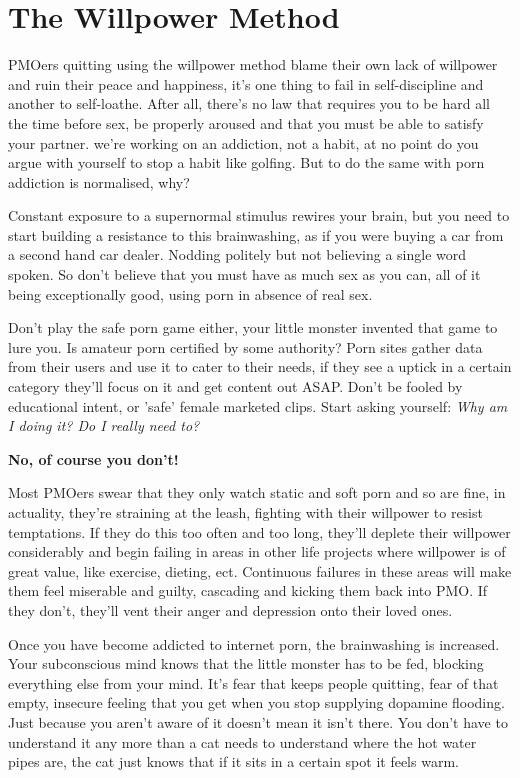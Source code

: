 \documentclass[easypeasy.tex]{subfiles}
\begin{document}
\section{The Willpower Method}
PMOers quitting using the willpower method blame their own lack of willpower and ruin their peace and happiness, it's one thing to fail in self-discipline and another to self-loathe. After all, there's no law that requires you to be hard all the time before sex, be properly aroused and that you must be able to satisfy your partner. we're working on an addiction, not a habit, at no point do you argue with yourself to stop a habit like golfing. But to do the same with porn addiction is normalised, why?

Constant exposure to a supernormal stimulus rewires your brain, but you need to start building a resistance to this brainwashing, as if you were buying a car from a second hand car dealer. Nodding politely but not believing a single word spoken. So don't believe that you must have as much sex as you can, all of it being exceptionally good, using porn in absence of real sex.

Don't play the safe porn game either, your little monster invented that game to lure you. Is amateur porn certified by some authority? Porn sites gather data from their users and use it to cater to their needs, if they see a uptick in a certain category they'll focus on it and get content out ASAP. Don't be fooled by educational intent, or 'safe' female marketed clips. Start asking yourself: \textit{Why am I doing it? Do I really need to?}

\textbf{No, of course you don't!}

Most PMOers swear that they only watch static and soft porn and so are fine, in actuality, they're straining at the leash, fighting with their willpower to resist temptations. If they do this too often and too long, they'll deplete their willpower considerably and begin failing in areas in other life projects where willpower is of great value, like exercise, dieting, ect. Continuous failures in these areas will make them feel miserable and guilty, cascading and kicking them back into PMO. If they don't, they'll vent their anger and depression onto their loved ones.

Once you have become addicted to internet porn, the brainwashing is increased. Your subconscious mind knows that the little monster has to be fed, blocking everything else from your mind. It's fear that keeps people quitting, fear of that empty, insecure feeling that you get when you stop supplying dopamine flooding. Just because you aren't aware of it doesn't mean it isn't there. You don't have to understand it any more than a cat needs to understand where the hot water pipes are, the cat just knows that if it sits in a certain spot it feels warm.
\end{document}
